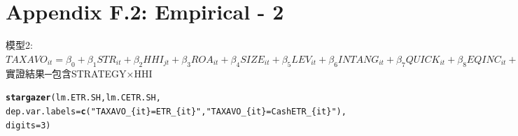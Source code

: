 \documentclass[a4paper,14pt]{article}\usepackage[]{graphicx}\usepackage[]{color}
\makeatletter
\newcommand{\hlnum}[1]{\textcolor[rgb]{0.686,0.059,0.569}{#1}}%
\newcommand{\hlstr}[1]{\textcolor[rgb]{0.192,0.494,0.8}{#1}}%
\newcommand{\hlstd}[1]{\textcolor[rgb]{0.345,0.345,0.345}{#1}}%
\newcommand{\hlkwc}[1]{\textcolor[rgb]{0.333,0.667,0.333}{#1}}%
\newcommand{\hlkwd}[1]{\textcolor[rgb]{0.737,0.353,0.396}{\textbf{#1}}}%
\newenvironment{kframe}{%
 \def\at@end@of@kframe{}%
 \ifinner\ifhmode%
  \def\at@end@of@kframe{\end{minipage}}%
  \begin{minipage}{\columnwidth}%
 \fi\fi%
 \def\FrameCommand##1{\hskip\@totalleftmargin \hskip-\fboxsep
 \colorbox{shadecolor}{##1}\hskip-\fboxsep
     \hskip-\linewidth \hskip-\@totalleftmargin \hskip\columnwidth}%
 \MakeFramed {\advance\hsize-\width
   \@totalleftmargin\z@ \linewidth\hsize
   \@setminipage}}%
 {\par\unskip\endMakeFramed%
 \at@end@of@kframe}
\makeatother
\begin{document}
\section{\\Appendix F.2: Empirical - 2} \label{App:Appendix F.2}
模型2:\\
$TAXAVO_{it}=\beta_{0}+\beta_{1}STR_{it}+\beta_{2}HHI_{jt}+\beta_{3}ROA_{it}+\beta_{4}SIZE_{it}+\beta_{5}LEV_{it}+\beta_{6}INTANG_{it}+\beta_{7}QUICK_{it}+\beta_{8}EQINC_{it}+\beta_{9}OUTINSTI_{it}+\beta_{10}RELAT_{it}+\beta_{11}FAMILY_{it}+\beta_{12}GDP_{it}+\varepsilon_{13}$\\
實證結果─包含STRATEGY×HHI\\
\begin{kframe}
\begin{alltt}
  \hlkwd{stargazer}\hlstd{(lm.ETR.SH,lm.CETR.SH,}
    \hlkwc{dep.var.labels} \hlstd{=} \hlkwd{c}\hlstd{(}\hlstr{"TAXAVO_\{it\}=ETR_\{it\}"}\hlstd{,}\hlstr{"TAXAVO_\{it\}=CashETR_\{it\}"}\hlstd{),}
    \hlkwc{digits}\hlstd{=}\hlnum{3}\hlstd{)}
\end{alltt}
\end{kframe}
\end{document}
